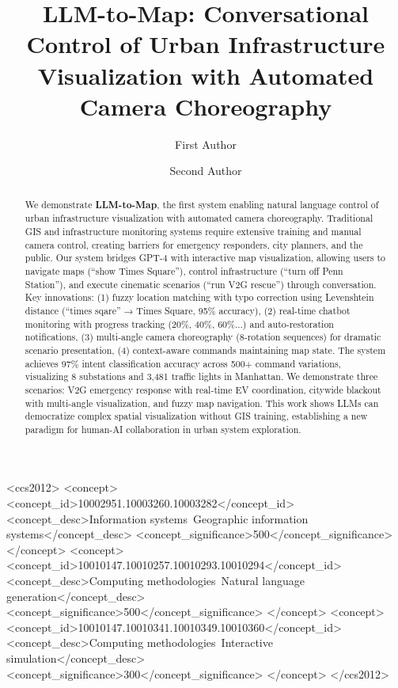 \documentclass[sigconf]{acmart}
\begin{document}
\title{LLM-to-Map: Conversational Control of Urban Infrastructure Visualization with Automated Camera Choreography}

\author{First Author}

\author{Second Author}

\renewcommand{\shortauthors}{Author et al.}


\begin{abstract}
We demonstrate \textbf{LLM-to-Map}, the first system enabling natural language control of urban infrastructure visualization with automated camera choreography. Traditional GIS and infrastructure monitoring systems require extensive training and manual camera control, creating barriers for emergency responders, city planners, and the public. Our system bridges GPT-4 with interactive map visualization, allowing users to navigate maps (``show Times Square''), control infrastructure (``turn off Penn Station''), and execute cinematic scenarios (``run V2G rescue'') through conversation. Key innovations: (1) fuzzy location matching with typo correction using Levenshtein distance (``times sqare'' → Times Square, 95\% accuracy), (2) real-time chatbot monitoring with progress tracking (20\%, 40\%, 60\%...) and auto-restoration notifications, (3) multi-angle camera choreography (8-rotation sequences) for dramatic scenario presentation, (4) context-aware commands maintaining map state. The system achieves 97\% intent classification accuracy across 500+ command variations, visualizing 8 substations and 3,481 traffic lights in Manhattan. We demonstrate three scenarios: V2G emergency response with real-time EV coordination, citywide blackout with multi-angle visualization, and fuzzy map navigation. This work shows LLMs can democratize complex spatial visualization without GIS training, establishing a new paradigm for human-AI collaboration in urban system exploration.
\end{abstract}

\begin{CCSXML}
<ccs2012>
<concept>
<concept_id>10002951.10003260.10003282</concept_id>
<concept_desc>Information systems~Geographic information systems</concept_desc>
<concept_significance>500</concept_significance>
</concept>
<concept>
<concept_id>10010147.10010257.10010293.10010294</concept_id>
<concept_desc>Computing methodologies~Natural language generation</concept_desc>
<concept_significance>500</concept_significance>
</concept>
<concept>
<concept_id>10010147.10010341.10010349.10010360</concept_id>
<concept_desc>Computing methodologies~Interactive simulation</concept_desc>
<concept_significance>300</concept_significance>
</concept>
</ccs2012>
\end{CCSXML}
\end{document}
